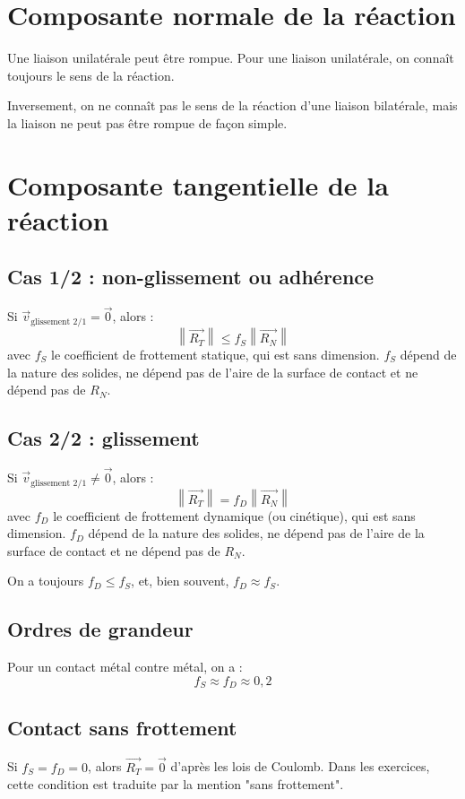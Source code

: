 \documentclass[french]{book}
\theoremstyle{plain}
\theoremstyle{definition}
\theoremstyle{remark}
\begin{document}
\section{Composante normale de la réaction}
Une liaison unilatérale peut être rompue. Pour une liaison unilatérale, on connaît toujours le sens de la réaction. \\ 
\par Inversement, on ne connaît pas le sens de la réaction d'une liaison bilatérale, mais la liaison ne peut pas être rompue de façon simple.
\section{Composante tangentielle de la réaction}
\subsection{Cas 1/2 : non-glissement ou adhérence}
Si $\overrightarrow{v}_{\text{glissement }2/1}=\overrightarrow{0}$, alors : $$\left\lVert\overrightarrow{R_T}\right\rVert\leqslant f_S\left\lVert\overrightarrow{R_N}\right\rVert$$ avec $f_S$ le coefficient de frottement statique, qui est sans dimension. $f_S$ dépend de la nature des solides, ne dépend pas de l'aire de la surface de contact et ne dépend pas de $R_N$.
\subsection{Cas 2/2 : glissement}
Si $\overrightarrow{v}_{\text{glissement }2/1}\ne\overrightarrow{0}$, alors : $$\left\lVert\overrightarrow{R_T}\right\rVert= f_D\left\lVert\overrightarrow{R_N}\right\rVert$$ avec $f_D$ le coefficient de frottement dynamique (ou cinétique), qui est sans dimension. $f_D$ dépend de la nature des solides, ne dépend pas de l'aire de la surface de contact et ne dépend pas de $R_N$. \\
\par On a toujours $f_D\leqslant f_S$, et, bien souvent, $f_D\approx f_S$.
\subsection{Ordres de grandeur}
Pour un contact métal contre métal, on a : $$f_S\approx f_D\approx 0,2$$
\subsection{Contact sans frottement}
Si $f_S=f_D=0$, alors $\overrightarrow{R_T}=\overrightarrow{0}$ d'après les lois de Coulomb. Dans les exercices, cette condition est traduite par la mention "sans frottement".
\end{document}
